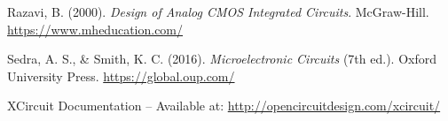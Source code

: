 \documentclass[9pt,conference]{IEEEtran}
\begin{document}
\begin{thebibliography}{00}
Razavi, B. (2000). \textit{Design of Analog CMOS Integrated Circuits}. McGraw-Hill. \url{https://www.mheducation.com/}

Sedra, A. S., & Smith, K. C. (2016). \textit{Microelectronic Circuits} (7th ed.). Oxford University Press. \url{https://global.oup.com/}

XCircuit Documentation – Available at: \url{http://opencircuitdesign.com/xcircuit/}
\end{thebibliography}
\end{document}
